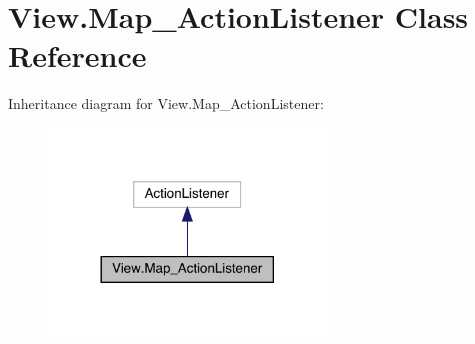 \hypertarget{class_view_1_1_map___action_listener}{}\section{View.\+Map\+\_\+\+Action\+Listener Class Reference}
\label{class_view_1_1_map___action_listener}


Inheritance diagram for View.\+Map\+\_\+\+Action\+Listener\+:
\nopagebreak
\begin{figure}[H]
\begin{center}
\leavevmode
\includegraphics[width=209pt]{class_view_1_1_map___action_listener__inherit__graph}
\end{center}
\end{figure}



